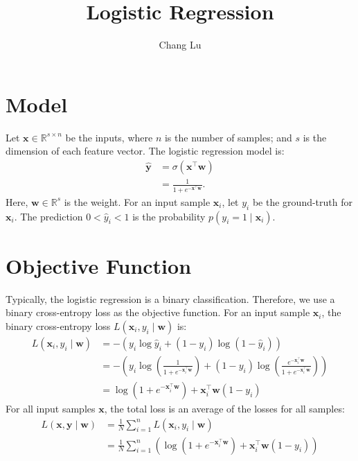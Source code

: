 \documentclass{article}
\title{Logistic Regression}
\author{Chang Lu}
\begin{document}
\maketitle

\section{Model}
Let $\mathbf{x} \in \mathbb{R}^{s \times n}$ be the inputs, where $n$ is the number of samples; and $s$ is the dimension of each feature vector. The logistic regression model is:
\begin{align}
    \hat{\mathbf{y}} &= \sigma\left(\mathbf{x}^\top\mathbf{w}\right) \\
    & = \frac{1}{1 + e^{-\mathbf{x^\top w}}}.
\end{align}
Here, $\mathbf{w} \in \mathbb{R}^s$ is the weight. For an input sample $\mathbf{x}_i$, let $y_i$ be the ground-truth for $\mathbf{x}_i$. The prediction $0 < \hat{{y}}_i < 1$ is the probability $p\left(y_i = 1 \mid \mathbf{x}_i\right)$.

\section{Objective Function}
Typically, the logistic regression is a binary classification. Therefore, we use a binary cross-entropy loss as the objective function. For an input sample $\mathbf{x}_i$, the binary cross-entropy loss $L(\mathbf{x}_i, y_i \mid \mathbf{w})$ is:
\begin{align}
    L(\mathbf{x}_i, y_i \mid \mathbf{w}) &= -\left(y_i \log\hat{y}_i + \left(1 - y_i\right)\log\left(1 - \hat{y}_i\right)\right) \\
    &= -\left(y_i \log\left(\frac{1}{1 + e^{-\mathbf{x}^\top_i\mathbf{w}}}\right) + \left(1 - y_i\right)\log\left(\frac{e^{-\mathbf{x}^\top_i\mathbf{w}}}{1 + e^{-\mathbf{x}^\top_i\mathbf{w}}}\right)\right) \\
    &= \log\left(1 + e^{-\mathbf{x}^\top_i\mathbf{w}}\right) + \mathbf{x}^\top_i\mathbf{w}\left(1 - y_i\right)
\end{align}
For all input samples $\mathbf{x}$, the total loss is an average of the losses for all samples:
\begin{align}
    L(\mathbf{x}, \mathbf{y} \mid \mathbf{w}) &= \frac{1}{N}\sum_{i = 1}^{n}{L(\mathbf{x}_i, y_i \mid \mathbf{w})} \\
    &= \frac{1}{N}\sum_{i = 1}^{n}{\left(\log\left(1 + e^{-\mathbf{x}^\top_i\mathbf{w}}\right) + \mathbf{x}^\top_i\mathbf{w}\left(1 - y_i\right)\right)}
\end{align}
\end{document}
